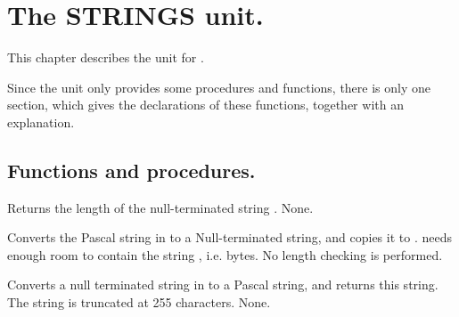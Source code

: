 %
%
%
%
%
\chapter{The STRINGS unit.}
This chapter describes the  unit for 
\fpc. 

Since the unit only provides some procedures and functions, there is
only one section, which gives the declarations of these functions, together
with an explanation. 

\section{Functions and procedures.}

{
Returns the length of the null-terminated string .
}
{None.}{}



{
Converts the Pascal string in  to a Null-terminated 
string, and copies it to .  needs enough room to contain
the string , i.e.  bytes.
}
{No length checking is performed.}{ }



{
Converts a null terminated string in  to a Pascal string, and returns
this string. The string is truncated at 255 characters.
}
{None.}{ }



